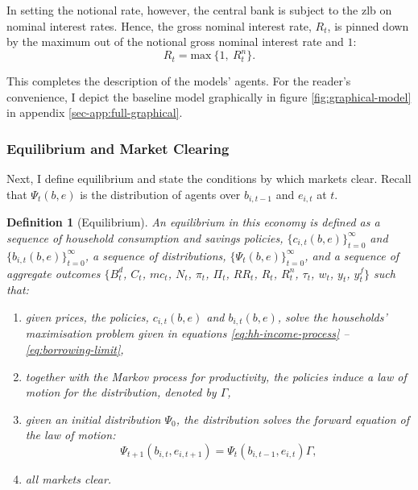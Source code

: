 \documentclass[12pt]{article} %
\numberwithin{equation}{section} %
\numberwithin{figure}{section}
\numberwithin{table}{section}
\newtheorem{definition}{Definition}
\begin{document}
In setting the notional rate, however, the central bank is subject to the \Gls{zlb} on nominal interest rates. Hence, the gross nominal interest rate, $R_t$, is pinned down by the maximum out of the notional gross nominal interest rate and $1$: 
\begin{equation}
    R_t = \text{max} \ \{ 1, \ R_{t}^n \}. \label{eq:zlb}
\end{equation}


This completes the description of the models' agents. For the reader's convenience, I depict the baseline model graphically in figure \ref{fig:graphical-model} in appendix \ref{sec-app:full-graphical}.

\subsubsection{Equilibrium and Market Clearing}
\label{sec:model-eq}

Next, I define equilibrium and state the conditions by which markets clear. Recall that $\Psi_t (b,e)$ is the distribution of agents over $b_{i,t-1}$ and $e_{i,t}$ at $t$.

\begin{definition}[Equilibrium]
\label{def:eq}
An equilibrium in this economy is defined as a sequence of household consumption and savings policies, $\{ c_{i,t} (b, e) \}_{t=0}^{\infty}$ and $\{ b_{i,t} (b, e) \}_{t=0}^{\infty}$, a sequence of distributions, $\{ \Psi_t (b,e) \}_{t=0}^{\infty} $, and a sequence of aggregate outcomes $\{ B_t^d$, $C_t$, $mc_t$, $N_t$, $\pi_t$, $\Pi_t$, $RR_t$, $R_t$, $R_t^n$, $\tau_t$, $w_t$, $y_t$, $y_t^f \}$ such that:
\begin{enumerate}
    \item given prices, the policies, $c_{i,t} (b, e)$ and $b_{i,t} (b, e)$, solve the households' maximisation problem given in equations \eqref{eq:hh-income-process} -- \eqref{eq:borrowing-limit},
    \item together with the Markov process for productivity, the policies induce a law of motion for the distribution, denoted by $\Gamma$,
    \item given an initial distribution $\Psi_0$, the distribution solves the forward equation of the law of motion:
    \begin{equation*}
        \Psi_{t+1} (b_{i,t},e_{i,t+1}) = \Psi_{t} (b_{i,t-1},e_{i,t}) \Gamma,
    \end{equation*}
    \item all markets clear.
\end{enumerate}
\end{definition}
\end{document}
